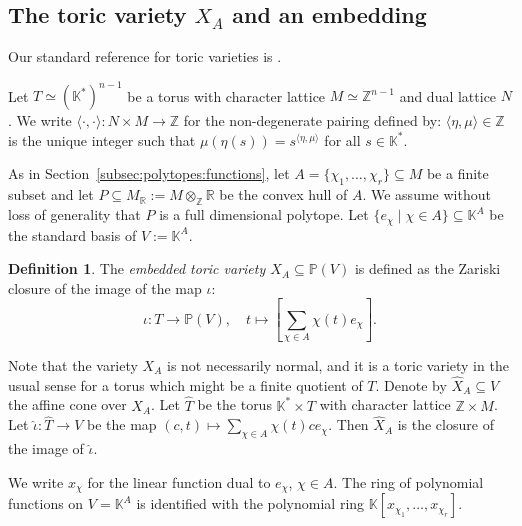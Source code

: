 \documentclass[12pt, a4article]{amsart}   	%
\numberwithin{equation}{section}
\theoremstyle{plain}
\theoremstyle{definition}
\newtheorem{definition}[theorem]{Definition}
\begin{document}
\subsection{The toric variety $X_{A}$ and an embedding}\label{subsec:toric-variety}

Our standard reference for toric varieties is \cite{CLS}.

Let $T\simeq (\mathbb K^*)^{n-1}$ be a torus with character lattice $M\simeq \mathbb Z^{n-1}$ and dual lattice $N$. We write $\langle\cdot ,\cdot \rangle:N\times M\to\mathbb{Z}$
for the non-degenerate pairing defined by: $\langle\eta,\mu\rangle\in \mathbb Z$ is the unique integer such that $\mu(\eta(s))=s^{\langle\eta,\mu\rangle}$ for all $s\in\mathbb K^*$.

As in Section~\ref{subsec:polytopes:functions}, let $A=\{\chi_1,\ldots,\chi_r\}\subseteq M$ be a finite subset and let $P\subseteq M_\mathbb R:=M\otimes_{\mathbb Z}\mathbb R$ be the convex hull of $A$. We assume without loss of generality that $P$  is a full dimensional polytope. Let $\{e_\chi\mid \chi\in A\}\subseteq \mathbb K^A$  be the standard basis of $V:=\mathbb K^A$. 

\begin{definition}{\cite[Definition 2.1.1]{CLS}}\label{definition:toric:variety}
The \textit{embedded toric variety $X_{A}\subseteq \mathbb P(V)$} is defined as the Zariski closure of the image of the  map 
$\iota$:
\begin{equation}\label{embedding:toric}
\iota:T \rightarrow \mathbb P(V),\quad t \mapsto \left[\sum_{\chi\in A} \chi(t) e_\chi\right].
\end{equation}
\end{definition}

Note that the variety  $X_{A}$ is not necessarily normal, and it is a toric variety in the usual sense for a torus which might be a finite quotient of $T$. Denote by $\hat X_{A}\subseteq V$ the affine cone over  $X_{A}$. Let $\hat T$ be the torus $\mathbb K^*\times T$ with character lattice $\mathbb Z\times M$. Let  $\hat\iota:\hat T\rightarrow V$ be the map $(c,t)  \mapsto \sum_{\chi\in A} \chi(t) ce_\chi$. Then $\hat X_{A}$ is the closure of the image of $\hat\iota$.

We write $x_{\chi}$ for the linear function dual to $e_\chi$, $\chi\in A$. The ring of polynomial functions on $V=\mathbb K^A$ is identified with the polynomial ring $\mathbb{K}[x_{\chi_1},\ldots,x_{\chi_r}]$.
\end{document}
